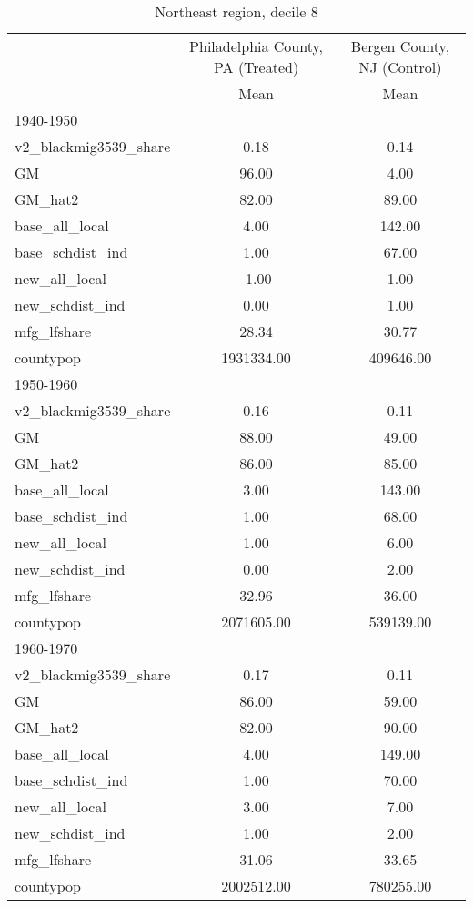 \begin{table}[htbp]\centering
\def\sym#1{\ifmmode^{#1}\else\(^{#1}\)\fi}
\caption{Northeast region, decile 8 \label{tab1}}
\begin{tabular}{l*{2}{c}}
\toprule
                    &\multicolumn{1}{c}{Philadelphia County, PA (Treated)}&\multicolumn{1}{c}{Bergen County, NJ (Control)}\\
                    &        Mean&        Mean\\
\midrule
1940-1950           &            &            \\
v2\_blackmig3539\_share&        0.18&        0.14\\
GM                  &       96.00&        4.00\\
GM\_hat2             &       82.00&       89.00\\
base\_all\_local      &        4.00&      142.00\\
base\_schdist\_ind    &        1.00&       67.00\\
new\_all\_local       &       -1.00&        1.00\\
new\_schdist\_ind     &        0.00&        1.00\\
mfg\_lfshare         &       28.34&       30.77\\
countypop           &  1931334.00&   409646.00\\
\midrule
1950-1960           &            &            \\
v2\_blackmig3539\_share&        0.16&        0.11\\
GM                  &       88.00&       49.00\\
GM\_hat2             &       86.00&       85.00\\
base\_all\_local      &        3.00&      143.00\\
base\_schdist\_ind    &        1.00&       68.00\\
new\_all\_local       &        1.00&        6.00\\
new\_schdist\_ind     &        0.00&        2.00\\
mfg\_lfshare         &       32.96&       36.00\\
countypop           &  2071605.00&   539139.00\\
\midrule
1960-1970           &            &            \\
v2\_blackmig3539\_share&        0.17&        0.11\\
GM                  &       86.00&       59.00\\
GM\_hat2             &       82.00&       90.00\\
base\_all\_local      &        4.00&      149.00\\
base\_schdist\_ind    &        1.00&       70.00\\
new\_all\_local       &        3.00&        7.00\\
new\_schdist\_ind     &        1.00&        2.00\\
mfg\_lfshare         &       31.06&       33.65\\
countypop           &  2002512.00&   780255.00\\
\bottomrule
\end{tabular}
\end{table}
